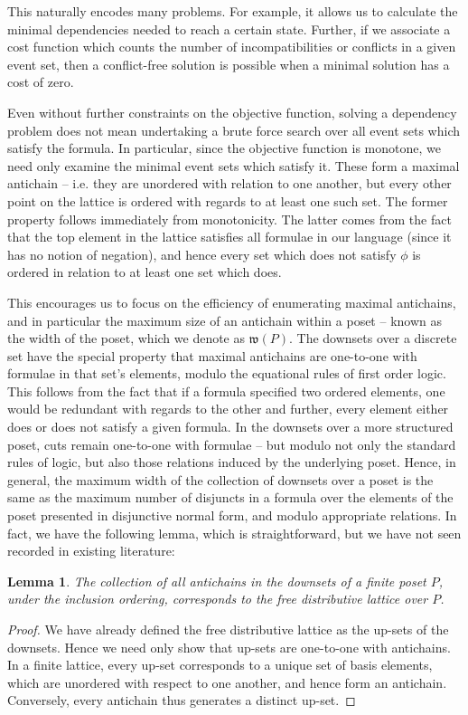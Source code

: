 \documentclass[hoptionsi,review,format=acmsmall]{acmart}
\newtheorem{lemma}[theorem]{Lemma}
\theoremstyle{definition}
\newcommand{\Wf}{\mathfrak{w}}
\begin{document}
This naturally encodes many problems. For example, it allows us to calculate the minimal dependencies needed to reach a certain state. Further, if we associate a cost function which counts the number of incompatibilities or conflicts in a given event set, then a conflict-free solution is possible when a minimal solution has a cost of zero.

Even without further constraints on the objective function, solving a dependency problem does not mean undertaking a brute force search over all event sets which satisfy the formula. In particular, since the objective function is monotone, we need only examine the minimal event sets which satisfy it. These form a maximal  antichain -- i.e. they are unordered with relation to one another, but every other point on the lattice is ordered with regards to at least one such set. The former property follows immediately from monotonicity. The latter comes from the fact that the top element in the lattice satisfies all formulae in our language (since it has no notion of negation), and hence every set which does not satisfy \(\phi\) is ordered in relation to at least one set which does.

This encourages us to focus on the efficiency of enumerating maximal antichains, and in particular the maximum size of an antichain within a poset -- known as the width of the poset, which we denote as \(\Wf(P)\). The downsets over a discrete set have the special property that maximal antichains are one-to-one with formulae in that set's elements, modulo the equational rules of first order logic. This follows from the fact that if a formula specified two ordered elements, one would be redundant with regards to the other and further, every element either does or does not satisfy a given formula. In the downsets over a more structured poset, cuts remain one-to-one with formulae -- but modulo not only the standard rules of logic, but also those relations induced by the underlying poset. Hence, in general, the maximum width of the collection of downsets over a poset is the same as the maximum number of disjuncts in a formula over the elements of the poset presented in disjunctive normal form, and modulo appropriate relations. In fact, we have the following lemma, which is straightforward, but we have not seen recorded in existing literature:

\begin{lemma}
The collection of all antichains in the downsets of a finite poset \(P\), under the inclusion ordering, corresponds to the free distributive lattice over \(P\).
\end{lemma}
\begin{proof}
We have already defined the free distributive lattice as the up-sets of the downsets. Hence we need only show that up-sets are one-to-one with antichains. In a finite lattice, every up-set corresponds to a unique set of basis elements, which are unordered with respect to one another, and hence form an antichain. Conversely, every antichain thus generates a distinct up-set.
\end{proof}
\end{document}
